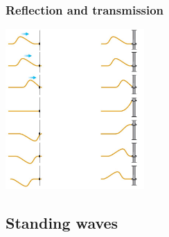 \documentclass[]{beamer}
\begin{document}


 \begin{frame}
 \frametitle{Reflection and transmission }










  

   \begin{center}
   \includegraphics[height=2.4in]{images4/12.jpg}
 \end{center}




  \end{frame}



\subsection{Standing waves  }
\end{document}
